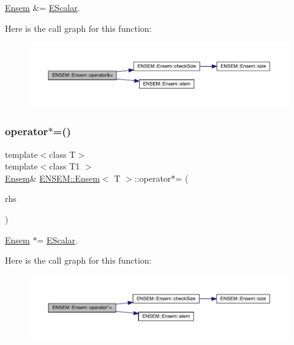 \mbox{\hyperlink{classENSEM_1_1Ensem}{Ensem}} \&= \mbox{\hyperlink{classENSEM_1_1EScalar}{E\+Scalar}}. 

Here is the call graph for this function\+:
\nopagebreak
\begin{figure}[H]
\begin{center}
\leavevmode
\includegraphics[width=350pt]{d7/d3e/classENSEM_1_1Ensem_ab5e9900522968210e53ec66b09a402fe_cgraph}
\end{center}
\end{figure}
\mbox{\label{classENSEM_1_1Ensem_abacb93dfca393ddb29f317d35e2fff7f}} 
\subsubsection{\texorpdfstring{operator$\ast$=()}{operator*=()}\hspace{0.1cm}{\footnotesize\ttfamily [1/6]}}
{\footnotesize\ttfamily template$<$class T$>$ \\
template$<$class T1 $>$ \\
\mbox{\hyperlink{classENSEM_1_1Ensem}{Ensem}}\& \mbox{\hyperlink{classENSEM_1_1Ensem}{E\+N\+S\+E\+M\+::\+Ensem}}$<$ T $>$\+::operator$\ast$= (\begin{DoxyParamCaption}\item[{const \mbox{\hyperlink{classENSEM_1_1EScalar}{E\+Scalar}}$<$ T1 $>$ \&}]{rhs }\end{DoxyParamCaption})\hspace{0.3cm}{\ttfamily [inline]}}



\mbox{\hyperlink{classENSEM_1_1Ensem}{Ensem}} $\ast$= \mbox{\hyperlink{classENSEM_1_1EScalar}{E\+Scalar}}. 

Here is the call graph for this function\+:
\nopagebreak
\begin{figure}[H]
\begin{center}
\leavevmode
\includegraphics[width=350pt]{d7/d3e/classENSEM_1_1Ensem_abacb93dfca393ddb29f317d35e2fff7f_cgraph}
\end{center}
\end{figure}
\mbox{\label{classENSEM_1_1Ensem_abacb93dfca393ddb29f317d35e2fff7f}} 
